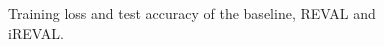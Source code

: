 \documentclass[english]{sobraep}
\begin{document}
\begin{figure}[htbp]
\centering
\captionsetup{justification=centering}
\caption{Training loss and test accuracy of the baseline, REVAL and iREVAL.}
\label{fig:CIFAR10_REVAl_Train_LOSS_Test_ACC}
\end{figure}
\end{document}
